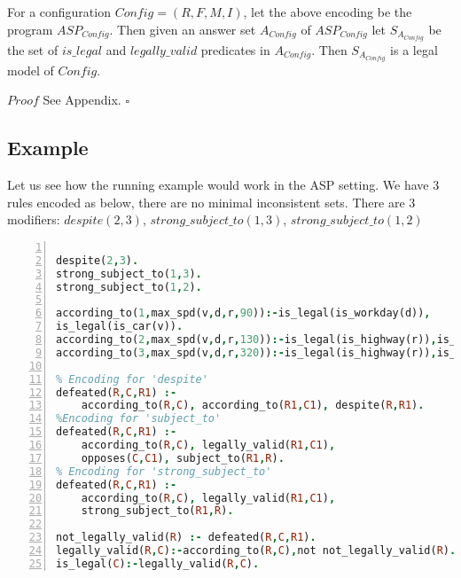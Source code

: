 \begin{proposition}\label{lemma:legal_model_of_config}
For a configuration $Config=(R,F,M,I)$, let the above encoding be the program $ASP_{Config}$. Then given an answer set $A_{Config}$ of $ASP_{Config}$ let $S_{A_{Config}}$ be the set of $is\_legal$ and $legally\_valid$ predicates in $A_{Config}$. Then $S_{A_{Config}}$ is a legal model of $Config$. 
\end{proposition}


$Proof$ See Appendix. $\square$


\subsection{Example}
Let us see how the running example would work in the ASP setting. We have 3 rules encoded as below, there are no minimal inconsistent sets. There are 3 modifiers: $despite(2,3)$,                           $strong\_subject\_to(1,3)$, $strong\_subject\_to(1,2)$
\begin{lstlisting}[language=Prolog, numbers=left]

despite(2,3).
strong_subject_to(1,3).
strong_subject_to(1,2).

according_to(1,max_spd(v,d,r,90)):-is_legal(is_workday(d)),
is_legal(is_car(v)).
according_to(2,max_spd(v,d,r,130)):-is_legal(is_highway(r)),is_legal(is_car(v)).
according_to(3,max_spd(v,d,r,320)):-is_legal(is_highway(r)),is_legal(is_sports_car(v)).

% Encoding for 'despite'
defeated(R,C,R1) :-
    according_to(R,C), according_to(R1,C1), despite(R,R1).
%Encoding for 'subject_to'
defeated(R,C,R1) :-
    according_to(R,C), legally_valid(R1,C1),
    opposes(C,C1), subject_to(R1,R).
% Encoding for 'strong_subject_to'
defeated(R,C,R1) :-
    according_to(R,C), legally_valid(R1,C1),
    strong_subject_to(R1,R).

not_legally_valid(R) :- defeated(R,C,R1).
legally_valid(R,C):-according_to(R,C),not not_legally_valid(R).
is_legal(C):-legally_valid(R,C).
\end{lstlisting}

